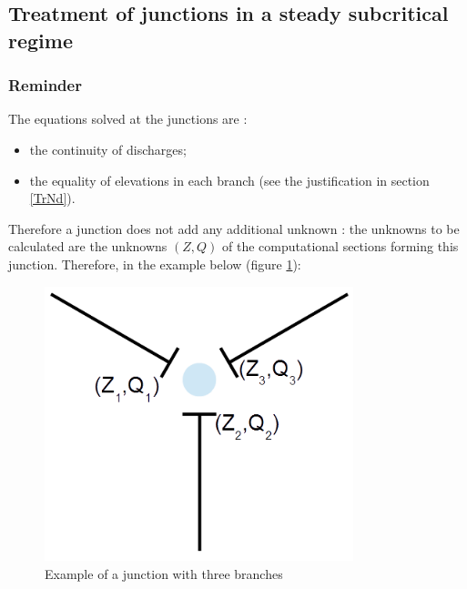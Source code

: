 \subsection{Treatment of junctions in a steady subcritical regime} \label{NdPERM}

\subsubsection{Reminder}

The equations solved at the junctions are :
\begin{itemize}
 \item the continuity of discharges;
 \item the equality of elevations in each branch (see the justification in section \ref{TrNd}).
\end{itemize}

Therefore a junction does not add any additional unknown : the unknowns to be calculated are the unknowns $(Z,Q)$ of the computational sections forming this junction. Therefore, in the example below (figure \ref{fig:SchNd}):

\begin{figure}[H]
 \begin{center}
  \includegraphics[width=0.8\textwidth]{Figures/Schema_noeud.png}
  \caption{Example of a junction with three branches}
  \label{fig:SchNd}
 \end{center}
\end{figure}


